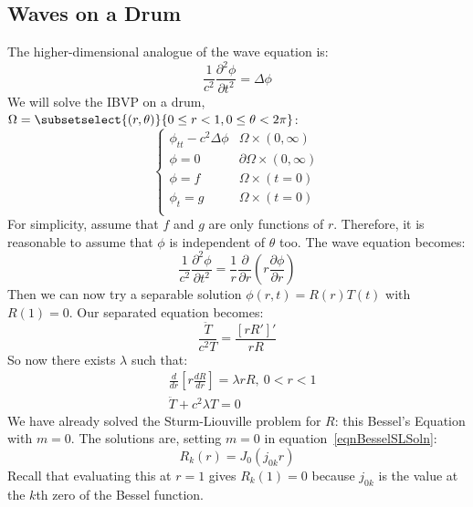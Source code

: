 \documentclass[../Main.tex]{subfiles}
\begin{document}
\subsection{Waves on a Drum}
The higher-dimensional analogue of the wave equation is:
\begin{equation}
    \frac{1}{c^2} \frac{\partial^{2}\phi}{\partial t^{2}} = \Delta \phi
    \label{eqnWave3D}
\end{equation}
We will solve the IBVP on a drum, $\Omega = \subsetselect{(r, \theta)}{0 \leq r < 1, 0 \leq \theta < 2\pi}$:
\begin{equation}
    \begin{cases}
        \phi_{tt} - c^2 \Delta \phi & \Omega \times (0, \infty) \\
        \phi = 0 & \partial \Omega \times (0, \infty) \\
        \phi = f & \Omega \times (t = 0) \\
        \phi_t = g & \Omega \times (t = 0) \\
    \end{cases}
    \label{eqnWaveDrum}
\end{equation}
For simplicity, assume that $f$ and $g$ are only functions of $r$. Therefore, it is reasonable to assume that $\phi$ is independent of $\theta$ too. The wave equation becomes:
\begin{equation*}
    \frac{1}{c^2} \frac{\partial^{2}\phi}{\partial t^{2}} = \frac{1}{r} \frac{\partial}{\partial r}\left(r \frac{\partial \phi}{\partial r}\right)
\end{equation*}
Then we can now try a separable solution $\phi(r, t) = R(r) T(t)$ with $R(1) = 0$. Our separated equation becomes:
\begin{equation*}
    \frac{\ddot{T}}{c^2 T} = \frac{[rR']'}{rR}
\end{equation*}
So now there exists $\lambda$ such that:
\begin{align*}
    &\frac{d}{dr}\left[r \frac{dR}{dr}\right] = \lambda rR,~0 < r < 1 \\
    &\ddot{T} + c^2 \lambda T = 0
\end{align*}
We have already solved the Sturm-Liouville problem for $R$: this Bessel's Equation with $m = 0$. The solutions are, setting $m = 0$ in equation~\ref{eqnBesselSLSoln}:
\begin{equation*}
    R_k(r) = J_{0}(j_{0k} r)
\end{equation*}
Recall that evaluating this at $r = 1$ gives $R_k(1) = 0$ because $j_{0k}$ is the value at the $k$th zero of the Bessel function.
\end{document}

